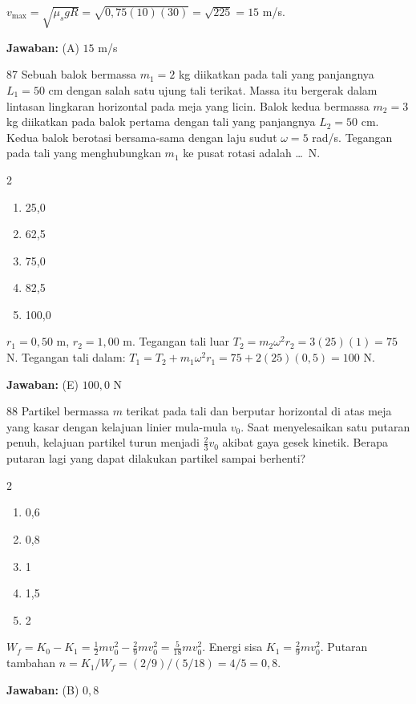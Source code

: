 \documentclass[11pt]{article}
\newenvironment{pilB}{%
  \par\smallskip\begin{multicols}{2}
  \begin{enumerate}[label=(\Alph*),leftmargin=*,itemsep=1pt,topsep=3pt]}%
  {\end{enumerate}\end{multicols}}
\newcommand{\jawaban}[1]{%
  \noindent\colorbox{gold!30}{\parbox{\dimexpr\linewidth-2\fboxsep\relax}{%
    \textbf{Jawaban:} #1}}\par\smallskip}
\begin{document}
\begin{pembox}
$v_{\max}=\sqrt{\mu_s gR}=\sqrt{0{,}75(10)(30)}=\sqrt{225}=15$ m/s.
\jawaban{(A) $15$ m/s}
\end{pembox}

\begin{soal}{87}
Sebuah balok bermassa $m_1=2$ kg diikatkan pada tali yang panjangnya
$L_1=50$ cm dengan salah satu ujung tali terikat. Massa itu bergerak
dalam lintasan lingkaran horizontal pada meja yang licin. Balok kedua
bermassa $m_2=3$ kg diikatkan pada balok pertama dengan tali yang
panjangnya $L_2=50$ cm. Kedua balok berotasi bersama-sama dengan laju
sudut $\omega=5$ rad/s. Tegangan pada tali yang menghubungkan $m_1$ ke
pusat rotasi adalah \ldots\ N.
\begin{pilB}
  \item 25,0 \item 62,5 \item 75,0 \item 82,5 \item 100,0
\end{pilB}
\end{soal}

\begin{pembox}
$r_1=0{,}50$ m, $r_2=1{,}00$ m. Tegangan tali luar $T_2=m_2\omega^2 r_2=3(25)(1)=75$ N. Tegangan tali dalam: $T_1=T_2+m_1\omega^2 r_1=75+2(25)(0{,}5)=100$ N.
\jawaban{(E) $100{,}0$ N}
\end{pembox}

\begin{soal}{88}
Partikel bermassa $m$ terikat pada tali dan berputar horizontal di atas
meja yang kasar dengan kelajuan linier mula-mula $v_0$. Saat
menyelesaikan satu putaran penuh, kelajuan partikel turun menjadi
$\tfrac{2}{3}v_0$ akibat gaya gesek kinetik. Berapa putaran lagi yang
dapat dilakukan partikel sampai berhenti?
\begin{pilB}
  \item 0,6 \item 0,8 \item 1 \item 1,5 \item 2
\end{pilB}
\end{soal}

\begin{pembox}
$W_f=K_0-K_1=\tfrac{1}{2}mv_0^2-\tfrac{2}{9}mv_0^2=\tfrac{5}{18}mv_0^2$. Energi sisa $K_1=\tfrac{2}{9}mv_0^2$. Putaran tambahan $n=K_1/W_f=(2/9)/(5/18)=4/5=0{,}8$.
\jawaban{(B) $0{,}8$}
\end{pembox}
\end{document}
